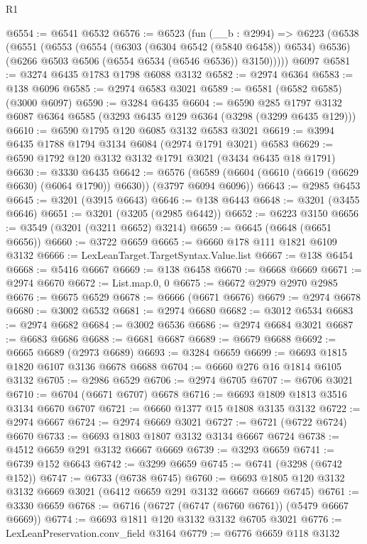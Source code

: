 \begin{lexlean}{R1}
\begin{coremodule}
@6554 := @6541 @6532
@6576 := @6523
    (fun (__b : @2994) =>
    @6223
      (@6538
        (@6551
          (@6553
            (@6554 (@6303 (@6304 @6542 (@5840 @6458)) @6534) @6536)
            (@6266 @6503 @6506 (@6554 @6534 (@6546 @6536)) @3150)))))
    @6097
@6581 := @3274 @6435 @1783 @1798 @6088 @3132
@6582 := @2974 @6364
@6583 := @138 @6096
@6585 := @2974 @6583 @3021
@6589 := @6581 (@6582 @6585) (@3000 @6097)
@6590 := @3284 @6435
@6604 := @6590
    @285
    @1797
    @3132
    @6087
    @6364
    @6585
    (@3293 @6435 @129 @6364 (@3298 (@3299 @6435 @129)))
@6610 := @6590 @1795 @120 @6085 @3132 @6583 @3021
@6619 := @3994 @6435 @1788 @1794 @3134 @6084 (@2974 @1791 @3021) @6583
@6629 := @6590 @1792 @120 @3132 @3132 @1791 @3021 (@3434 @6435 @18 @1791)
@6630 := @3330 @6435
@6642 := @6576 (@6589 (@6604 (@6610 (@6619 (@6629 @6630) (@6064 @1790)) @6630)) (@3797 @6094 @6096))
@6643 := @2985 @6453
@6645 := @3201 (@3915 @6643)
@6646 := @138 @6443
@6648 := @3201 (@3455 @6646)
@6651 := @3201 (@3205 (@2985 @6442))
@6652 := @6223 @3150
@6656 := @3549 (@3201 (@3211 @6652) @3214)
@6659 := @6645 (@6648 (@6651 @6656))
@6660 := @3722 @6659
@6665 := @6660 @178 @111 @1821 @6109 @3132
@6666 := LexLeanTarget.TargetSyntax.Value.list
@6667 := @138 @6454
@6668 := @5416 @6667
@6669 := @138 @6458
@6670 := @6668 @6669
@6671 := @2974 @6670
@6672 := List.map.{0, 0}
@6675 := @6672 @2979 @2970 @2985
@6676 := @6675 @6529
@6678 := @6666 (@6671 @6676)
@6679 := @2974 @6678
@6680 := @3002 @6532
@6681 := @2974 @6680
@6682 := @3012 @6534
@6683 := @2974 @6682
@6684 := @3002 @6536
@6686 := @2974 @6684 @3021
@6687 := @6683 @6686
@6688 := @6681 @6687
@6689 := @6679 @6688
@6692 := @6665 @6689 (@2973 @6689)
@6693 := @3284 @6659
@6699 := @6693 @1815 @1820 @6107 @3136 @6678 @6688
@6704 := @6660 @276 @16 @1814 @6105 @3132
@6705 := @2986 @6529
@6706 := @2974 @6705
@6707 := @6706 @3021
@6710 := @6704 (@6671 @6707) @6678
@6716 := @6693 @1809 @1813 @3516 @3134 @6670 @6707
@6721 := @6660 @1377 @15 @1808 @3135 @3132
@6722 := @2974 @6667
@6724 := @2974 @6669 @3021
@6727 := @6721 (@6722 @6724) @6670
@6733 := @6693 @1803 @1807 @3132 @3134 @6667 @6724
@6738 := @4512 @6659 @291 @3132 @6667 @6669
@6739 := @3293 @6659
@6741 := @6739 @152 @6643
@6742 := @3299 @6659
@6745 := @6741 (@3298 (@6742 @152))
@6747 := @6733 (@6738 @6745)
@6760 := @6693 @1805 @120 @3132 @3132 @6669 @3021 (@6412 @6659 @291 @3132 @6667 @6669 @6745)
@6761 := @3330 @6659
@6768 := @6716 (@6727 (@6747 (@6760 @6761)) (@5479 @6667 @6669))
@6774 := @6693 @1811 @120 @3132 @3132 @6705 @3021
@6776 := LexLeanPreservation.conv_field @3164
@6779 := @6776 @6659 @118 @3132

\end{coremodule}
\end{lexlean}
